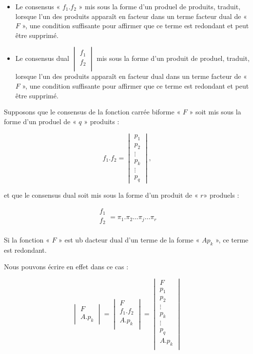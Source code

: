  \begin{itemize}
 \item Le \textsf{consensus} « $f_1 . f_2$ » mis sous la forme d'un produel de produits, traduit, lorsque l'un des produits apparaît en facteur dans un terme facteur dual de « $F$ », une condition suffisante pour affirmer que ce terme est redondant et peut être supprimé.
 
  \item Le \textsf{consensus dual} $ \begin{vmatrix} f_1 \\ f_2 \\ \end{vmatrix}$ mis sous la forme d'un produit de produel, traduit, lorsque l'un des produits apparaît en facteur dual dans un terme facteur de « $F$ », une condition suffisante pour affirmer que ce terme est redondant et peut être supprimé.
 
 \end{itemize}
 


 Supposons que le consensus de la fonction carrée biforme « $F$ » soit mis sous la forme d'un produel de « $q$ » produits : 
 
 \[ f_1 . f_2 = \begin{vmatrix} p_1 \\ p_2 \\ \vdots \\ p_k  \\ \vdots \\ p_q \end{vmatrix}\text{,} \]
 
 et que le consensus dual soit mis sous  la forme d'un produit de « $r$» produels : 
 
\[ \begin{array}{|c|} f_1 \\ f_2 \\ \end{array} = \pi_1 . \pi_2\ldots \pi_j\ldots \pi_r  \]


 
 Si la fonction « $F$ » est ub dacteur dual d'un terme de la forme « $Ap_k$ », ce terme est redondant.
 
 Nous pouvons écrire en effet dans ce cas : 
 
 \[ \begin{vmatrix}
 F\\ A.p_k
 \end{vmatrix} = \begin{vmatrix} F \\  f_1 . f_2 \\ A . p_k \\\end{vmatrix} 
               = \begin{vmatrix} F \\ p_1 \\ p_2 \\ \vdots \\ p_k \\ \vdots \\ p_q \\A.p_k\\ \end{vmatrix}
 \]
 
